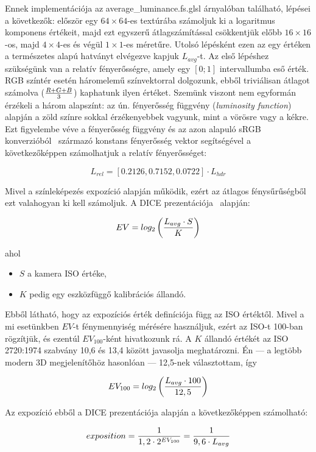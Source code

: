 Ennek implementációja az average\_luminance.fs.glsl árnyalóban található, lépései a következők: először egy \(64 \times 64\)-es textúrába számoljuk ki a logaritmus komponens értékeit, majd ezt egyszerű átlagszámítással csökkentjük előbb \(16 \times 16\)-os, majd \(4 \times 4\)-es és végül \(1 \times 1\)-es méretűre. Utolsó lépésként ezen az egy értéken a természetes alapú hatványt elvégezve kapjuk \(L_{avg}\)-t. Az első lépéshez szükségünk van a relatív fényerősségre, amely egy \([0; 1]\) intervallumba eső érték. RGB színtér esetén háromelemű színvektorral dolgozunk, ebből triviálisan átlagot számolva (\( { R + G + B } \over 3 \)) kaphatunk ilyen értéket. Szemünk viszont nem egyformán érzékeli a három alapszínt: az ún. fényerősség függvény (\textit{luminosity function}) alapján a zöld színre sokkal érzékenyebbek vagyunk, mint a vörösre vagy a kékre. Ezt figyelembe véve a fényerősség függvény és az azon alapuló sRGB konverzióból~\cite{stokes2012standard} származó konstans fényerősség vektor segítségével a következőképpen számolhatjuk a relatív fényerősséget:

\[
L_{rel} = [0.2126, 0.7152, 0.0722] \cdot L_{hdr}
\]

Mivel a színleképezés expozíció alapján működik, ezért az átlagos fénysűrűségből ezt valahogyan ki kell számoljuk. A DICE prezentációja~\cite{dice_moving_frostbite_to_pbr} alapján:

\[
EV = log_2\left({ L_{avg} \cdot S } \over K\right)
\]

ahol

\begin{itemize}[noitemsep]
\item \(S\) a kamera ISO értéke,
\item \(K\) pedig egy eszközfüggő kalibrációs állandó.
\end{itemize}

Ebből látható, hogy az expozíciós érték definíciója függ az ISO értéktől. Mivel a mi esetünkben \(EV\)-t fénymennyiség mérésére használjuk, ezért az ISO-t 100-ban rögzítjük, és ezentúl \(EV_{100}\)-ként hivatkozunk rá. A \(K\) állandó értékét az ISO 2720:1974 szabvány 10,6 és 13,4 között javasolja meghatározni. Én --- a legtöbb modern 3D megjelenítőhöz hasonlóan --- 12,5-nek választottam, így

\[
EV_{100} = log_2\left({ L_{avg} \cdot 100 } \over 12,5\right)
\]

Az expozíció ebből a DICE prezentációja alapján a következőképpen számolható:

\[
exposition = { 1 \over { 1,2 \cdot 2^{EV_{100}} } } = { 1 \over { 9,6 \cdot L_{avg} } }
\]


